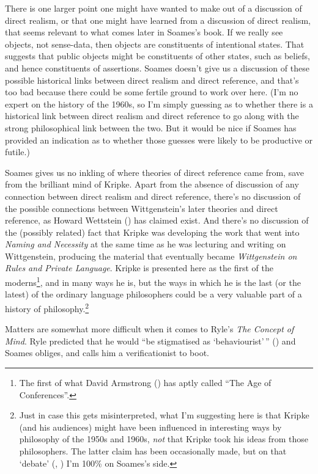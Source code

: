 \documentclass[
  11pt,
  letterpaper,
  DIV=11,
  numbers=noendperiod,
  twoside]{scrartcl}
\begin{document}
There is one larger point one might have wanted to make out of a
discussion of direct realism, or that one might have learned from a
discussion of direct realism, that seems relevant to what comes later in
Soames's book. If we really see objects, not sense-data, then objects
are constituents of intentional states. That suggests that public
objects might be constituents of other states, such as beliefs, and
hence constituents of assertions. Soames doesn't give us a discussion of
these possible historical links between direct realism and direct
reference, and that's too bad because there could be some fertile ground
to work over here. (I'm no expert on the history of the 1960s, so I'm
simply guessing as to whether there is a historical link between direct
realism and direct reference to go along with the strong philosophical
link between the two. But it would be nice if Soames has provided an
indication as to whether those guesses were likely to be productive or
futile.)

Soames gives us no inkling of where theories of direct reference came
from, save from the brilliant mind of Kripke. Apart from the absence of
discussion of any connection between direct realism and direct
reference, there's no discussion of the possible connections between
Wittgenstein's later theories and direct reference, as Howard Wettstein
() has claimed exist. And there's no
discussion of the (possibly related) fact that Kripke was developing the
work that went into \emph{Naming and Necessity} at the same time as he
was lecturing and writing on Wittgenstein, producing the material that
eventually became \emph{Wittgenstein on Rules and Private Language}.
Kripke is presented here as the first of the moderns\footnote{The first
  of what David Armstrong () has aptly
  called ``The Age of Conferences''.}, and in many ways he is, but the
ways in which he is the last (or the latest) of the ordinary language
philosophers could be a very valuable part of a history of
philosophy.\footnote{Just in case this gets misinterpreted, what I'm
  suggesting here is that Kripke (and his audiences) might have been
  influenced in interesting ways by philosophy of the 1950s and 1960s,
  \emph{not} that Kripke took his ideas from those philosophers. The
  latter claim has been occasionally made, but on that `debate'
  (,
  ) I'm 100\% on Soames's side.}

Matters are somewhat more difficult when it comes to Ryle's \emph{The
Concept of Mind}. Ryle predicted that he would ``be stigmatised as
`behaviourist'\,'' () and Soames
obliges, and calls him a verificationist to boot.
\end{document}
